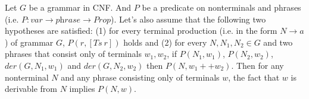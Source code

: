 %

\begin{lemma}
	Let $G$ be a grammar in CNF. And $P$ be a predicate on nonterminals and phrases (i.e. $P: var \to \textit{phrase} \to \textit{Prop}$).
	Let's also assume that the following two hypotheses are satisfied:
	(1) for every terminal production (i.e. in the form $N \to a$) of grammar $G$, $P(r, [Ts \ r])$ holds and (2) for every $N, N_1, N_2 \in G$ and two phrases that consist only of terminals $w_1, w_2$, if $P(N_1, w_1)$, $P(N_2, w_2)$, $der(G, N_1, w_1)$ and $der(G, N_2, w_2)$ then $P(N, w_1 ++ w_2)$.
	Then for any nonterminal $N$ and any phrase consisting only of terminals $w$, the fact that $w$ is derivable from $N$ implies $P(N,w)$.
\end{lemma}

%
%

